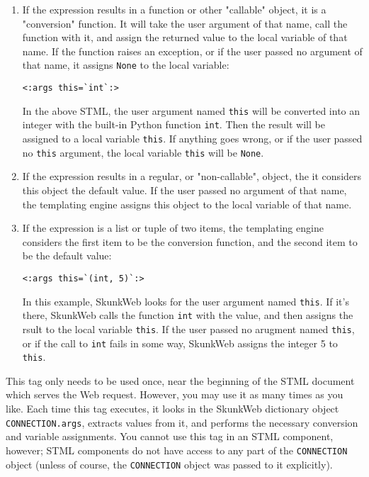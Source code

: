 \documentclass{manual}
\begin{document}
\begin{enumerate}

\item If the expression results in a function or other "callable"
object, it is a "conversion" function. It will take
the user argument of that name, call the function with it, and
assign the returned value to the local variable of that name.
If the function raises an exception, or if the user passed no
argument of that name, it assigns \texttt{None} to
the local variable:

\begin{verbatim}
<:args this=`int`:>
\end{verbatim}

In the above STML, the user argument named \texttt{this}
will be converted into an integer with the built-in Python
function \texttt{int}. Then the result will be assigned to
a local variable \texttt{this}. If anything goes wrong, 
or if the user passed no \texttt{this} argument, the local
variable \texttt{this} will be \texttt{None}.


\item If the expression results in a regular, or "non-callable",
object, the it considers this object the default value.  If the user
passed no argument of that name, the templating engine assigns this
object to the local variable of that name.

\item If the expression is a list or tuple of two items, the
templating engine considers the first item to be the conversion
function, and the second item to be the default value:

\begin{verbatim}
<:args this=`(int, 5)`:>
\end{verbatim}

In this example, SkunkWeb looks for the user argument named \texttt{this}.
If it's there, SkunkWeb calls the function \texttt{int} with the value,
and then assigns the rsult to the local variable \texttt{this}. If 
the user passed no arugment named \texttt{this}, or if the call to
\texttt{int} fails in some way, SkunkWeb assigns the integer 5 
to \texttt{this}.


\end{enumerate}


This tag only needs to be used once, near the beginning of the STML
document which serves the Web request. However, you may use it as many
times as you like. Each time this tag executes, it looks in the
SkunkWeb dictionary object \texttt{CONNECTION.args}, extracts values
from it, and performs the necessary conversion and variable
assignments.  You cannot use this tag in an STML component, however;
STML components do not have access to any part of the
\texttt{CONNECTION} object (unless of course, the \texttt{CONNECTION}
object was passed to it explicitly).
\end{document}
